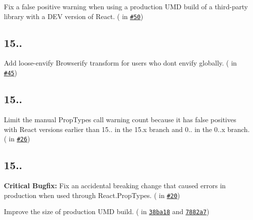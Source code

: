 
\begin{DoxyItemize}
\item Fix a false positive warning when using a production U\+MD build of a third-\/party library with a D\+EV version of React. (\href{https://github.com/gaearon}{\tt } in \href{https://github.com/reactjs/prop-types/pull/50}{\tt \#50})
\end{DoxyItemize}

\subsection*{15..}


\begin{DoxyItemize}
\item Add {\ttfamily loose-\/envify} Browserify transform for users who don\textquotesingle{}t envify globally. (\href{https://github.com/mridgway}{\tt } in \href{https://github.com/reactjs/prop-types/pull/45}{\tt \#45})
\end{DoxyItemize}

\subsection*{15..}


\begin{DoxyItemize}
\item Limit the manual Prop\+Types call warning count because it has false positives with React versions earlier than 15.. in the 15.\+x branch and 0.. in the 0..\+x branch. (\href{https://github.com/gaearon}{\tt } in \href{https://github.com/reactjs/prop-types/pull/26}{\tt \#26})
\end{DoxyItemize}

\subsection*{15..}


\begin{DoxyItemize}
\item {\bfseries Critical Bugfix\+:} Fix an accidental breaking change that caused errors in production when used through {\ttfamily React.\+Prop\+Types}. (\href{https://github.com/gaearon}{\tt } in \href{https://github.com/reactjs/prop-types/pull/20}{\tt \#20})
\item Improve the size of production U\+MD build. (\href{https://github.com/aweary}{\tt } in \href{https://github.com/reactjs/prop-types/commit/38ba18a4a8f705f4b2b33c88204573ddd604f2d6}{\tt 38ba18} and \href{https://github.com/reactjs/prop-types/commit/7882a7285293db5f284bcf559b869fd2cd4c44d4}{\tt 7882a7})
\end{DoxyItemize}

